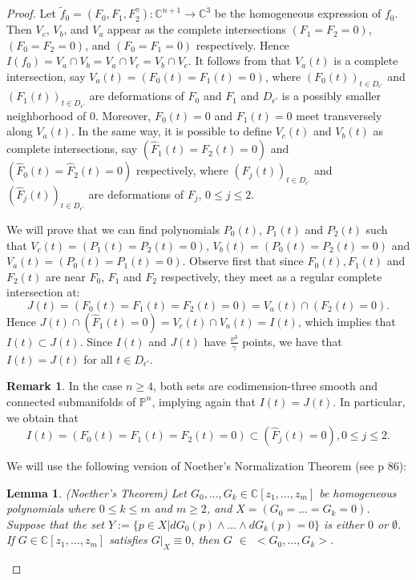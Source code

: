 \documentclass{amsart}
\newtheorem{lemma}[theorem]{Lemma}
\theoremstyle{definition}
\theoremstyle{proposition}
\newtheorem{remark}[theorem]{Remark}
\numberwithin{equation}{section}
\theoremstyle{main}
\begin{document}
\begin{proof} Let $\tilde f_{0}=(F_{0},F_{1},F^\gamma_{2}): \mathbb C^{n+1} \to\mathbb C^{3}$ be the homogeneous expression of $f_{0}$. Then $V_{c}$, $V_{b}$, and $V_{a}$ appear as the complete intersections $(F_{1}=F_{2}=0)$, $(F_{0}=F_{2}=0)$, and $(F_{0}=F_{1}=0)$ respectively. Hence $I(f_{0})=V_{a} \cap V_{b} =V_{a} \cap V_{c}= V_{b} \cap V_{c}$. It follows from \cite[section 4.6, p.235-236]{Ser0} that $V_{a}(t)$ is a complete intersection, say $V_{a}(t)=(F_{0}(t)=F_{1}(t)=0)$, where $(F_{0}(t))_{t \in D_{\epsilon'}}$ and $(F_{1}(t))_{t \in D_{\epsilon'}}$ are deformations of $F_{0}$ and $F_{1}$ and $ D_{\epsilon'}$ is a possibly smaller neighborhood of $0$. Moreover, $F_{0}(t)=0$ and $F_{1}(t)=0$ meet transversely along $V_{a}(t)$. In the same way, it is possible to define $V_{c}(t)$ and $V_{b}(t)$ as complete intersections, say $(\hat F_{1}(t)=F_{2}(t)=0)$ and $(\hat F_{0}(t)=\hat F_{2}(t)=0)$ respectively, where $(F_{j}(t))_{t \in D_{\epsilon'}}$ and $(\hat F_{j}(t))_{t \in D_{\epsilon'}}$ are deformations of $F_{j}$, $0\leq j\leq2$. 

We will prove that we can find polynomials $P_{0}(t)$, $P_{1}(t)$ and $P_{2}(t)$ such that $V_{c}(t)=(P_{1}(t)=P_{2}(t)=0)$, $V_{b}(t)=(P_{0}(t)=P_{2}(t)=0)$ and $V_{a}(t)=(P_{0}(t)=P_{1}(t)=0)$. Observe first that since $F_{0}(t), F_{1}(t)$ and $F_{2}(t)$ are near $F_{0}$, $F_{1}$ and $F_{2}$ respectively, they meet as a regular complete intersection at:
$$J(t)=(F_{0}(t)=F_{1}(t)=F_{2}(t)=0) = V_a(t) \cap (F_2(t)=0).$$
Hence $J(t) \cap (\hat F_{1}(t)=0)=V_{c}(t)\cap V_{a}(t)=I(t)$, which implies that $I(t)\subset J(t).$  Since $I(t)$ and $J(t)$ have $\frac{\nu^{3}}{\gamma}$ points, we have that  $I(t)=J(t)$ for all $t \in D_{\epsilon'}$. 
\begin{remark}In the case $n\geq 4$, both sets are codimension-three smooth and connected submanifolds of $\mathbb P^n$, implying again that $I(t)=J(t).$ In particular, we obtain that $$I(t)=(F_{0}(t)=F_{1}(t)=F_{2}(t)=0)\subset (\hat F_{j}(t)=0), 0\leq j\leq2.$$
 \end{remark}  
 
We will use the following version of Noether's Normalization Theorem (see \cite{ln} p 86):

\begin{lemma} (Noether's Theorem) Let $G_{0},...,G_{k}  \in \mathbb {C}[z_{1},...,z_{m}]$ be homogeneous polynomials where $0 \leq k \leq m$ and $m \geq 2$, and $X=(G_{0}=...=G_{k}=0)$. Suppose that the set $Y:=\{p \in X | dG_{0}(p) \wedge...\wedge dG_{k}(p)=0\}$ is either $0$ or $\emptyset$. If $G  \in \mathbb {C}[z_{1},...,z_{m}]$ satisfies $G|_{X} \equiv 0$, then  $G$  $\in$  $<G_{0},...,G_{k}>$. 
\end{lemma} 
 

\end{proof}
\end{document}
